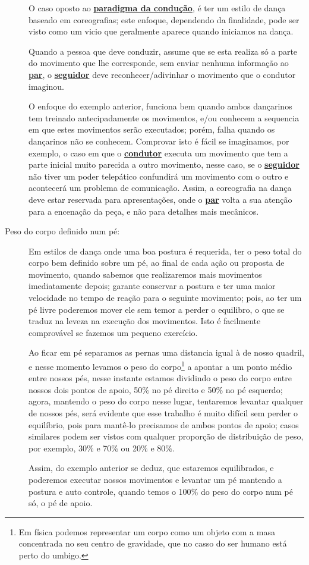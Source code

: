 \begin{description}
O caso oposto ao \hyperref[def:ParadigmaConducao]{\textbf{paradigma da condução}}, é ter um estilo de dança baseado em coreografias;
este enfoque, dependendo da finalidade, pode ser visto como um vicio que geralmente aparece quando iniciamos
na dança. 
\begin{example}
Quando a pessoa que deve conduzir, assume que se esta realiza só a parte do movimento 
que lhe corresponde, sem enviar nenhuma informação ao \hyperref[def:Par]{\textbf{par}}, 
o \hyperref[def:Seguidor]{\textbf{seguidor}} deve reconhecer/adivinhar o movimento que o condutor imaginou.
\end{example} 
O enfoque do exemplo anterior, funciona bem quando ambos dançarinos tem treinado antecipadamente os movimentos, 
e/ou conhecem a sequencia em que estes movimentos serão executados; 
porém, falha quando os dançarinos não se conhecem.
Comprovar isto é fácil se imaginamos, por exemplo, o caso em que o \hyperref[def:Condutor]{\textbf{condutor}} executa um movimento
que tem a parte inicial muito parecida a outro movimento, nesse caso, se o \hyperref[def:Seguidor]{\textbf{seguidor}} não tiver
um poder telepático confundirá um movimento com o outro e acontecerá um problema de comunicação. Assim, a coreografia
na dança deve estar reservada para apresentações, onde o \hyperref[def:Par]{\textbf{par}} volta 
a sua atenção para a encenação da peça, e não para detalhes mais mecânicos.

\item[Peso do corpo definido num pé:] Em estilos de dança onde uma boa postura é requerida,
ter o peso total do corpo bem definido sobre um pé, 
ao final de cada ação ou proposta de movimento,
quando sabemos que realizaremos mais movimentos imediatamente depois;
garante conservar a postura e ter uma maior velocidade no tempo de reação para o seguinte movimento;
pois, ao ter um pé livre poderemos mover ele sem temor a perder o equilibro, 
o que se traduz na leveza na execução dos movimentos. 
Isto é facilmente comprovável se fazemos um pequeno exercício. 
\begin{example}
Ao ficar em pé separamos as
pernas uma distancia igual à de nosso quadril, e nesse momento levamos o peso do corpo\footnote{
Em física podemos representar um corpo como um objeto com a masa concentrada no seu centro de gravidade, 
que no casso do ser humano está perto do umbigo.} a
apontar a um ponto médio entre nossos pés, nesse instante estamos dividindo o peso do corpo
entre nossos dois pontos de apoio, 50$\%$ no pé direito e 50$\%$ no pé esquerdo; agora, mantendo o peso
do corpo nesse lugar, tentaremos levantar qualquer de nossos pés, será evidente
que esse trabalho é muito difícil sem perder o equilíbrio, pois para mantê-lo
precisamos de ambos pontos de apoio; casos similares podem ser vistos com qualquer proporção de distribuição de peso,
por exemplo, 30$\%$ e 70$\%$ ou 20$\%$ e 80$\%$. 
\end{example}
Assim, do exemplo anterior se deduz, que estaremos
equilibrados, e poderemos executar nossos movimentos e levantar um pé 
mantendo a postura e auto controle, quando
temos o 100$\%$ do peso do corpo num pé só, o pé de apoio.
 

\end{description}

